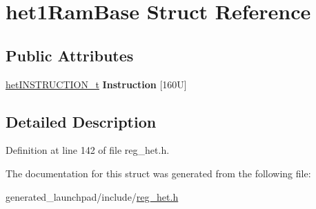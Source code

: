 \hypertarget{structhet1RamBase}{}\section{het1\+Ram\+Base Struct Reference}
\label{structhet1RamBase}
\subsection*{Public Attributes}
\begin{DoxyCompactItemize}
\item 
\mbox{\label{structhet1RamBase_a0a42e64d27867081d89f37ff139c5d44}} 
\mbox{\hyperlink{reg__het_8h_a51adb6af5a27a385e04c8750e3645738}{het\+I\+N\+S\+T\+R\+U\+C\+T\+I\+O\+N\+\_\+t}} {\bfseries Instruction} \mbox{[}160\+U\mbox{]}
\end{DoxyCompactItemize}


\subsection{Detailed Description}


Definition at line 142 of file reg\+\_\+het.\+h.



The documentation for this struct was generated from the following file\+:\begin{DoxyCompactItemize}
\item 
generated\+\_\+launchpad/include/\mbox{\hyperlink{reg__het_8h}{reg\+\_\+het.\+h}}\end{DoxyCompactItemize}
